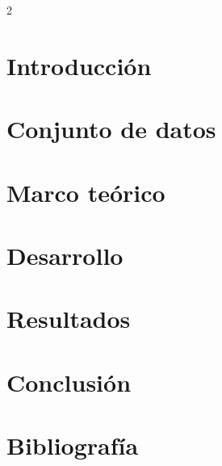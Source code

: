 \documentclass[twocolumn]{article}
\begin{document}
    \onecolumn
    

    \begin{multicols}{2}
    \section{Introducción}
      

    \section{Conjunto de datos}\label{sec:dataset}
     

    \section{Marco teórico}
        
    
    \section{Desarrollo}
    
    
    \end{multicols}
    \section{Resultados}
    

    \section{Conclusión}
    

    \newpage
    \section{Bibliografía}
    

\end{document}
